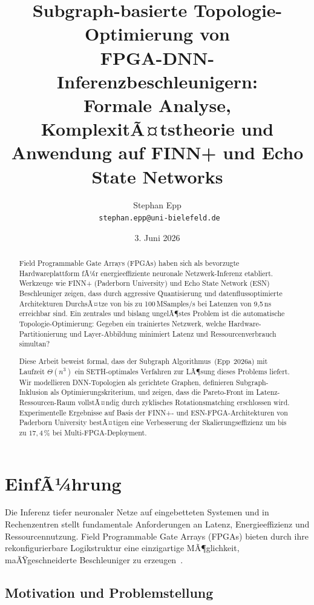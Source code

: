 ﻿\documentclass[a4paper,12pt]{article}
\title{%
  \textbf{Subgraph-basierte Topologie-Optimierung von}\\
  \textbf{FPGA-DNN-Inferenzbeschleunigern:}\\
  \textbf{Formale Analyse, KomplexitÃ¤tstheorie und}\\
  \textbf{Anwendung auf FINN+ und Echo State Networks}
}
\author{Stephan Epp\\
  \
  \small \texttt{stephan.epp@uni-bielefeld.de}
}
\date{3. Juni 2026}
\theoremstyle{definition}
\begin{document}
\maketitle

\begin{abstract}
Field Programmable Gate Arrays (FPGAs) haben sich als bevorzugte Hardwareplattform fÃ¼r energieeffiziente
neuronale Netzwerk-Inferenz etabliert. Werkzeuge wie FINN+ (Paderborn University) und Echo State Network
(ESN) Beschleuniger zeigen, dass durch aggressive Quantisierung und datenflussoptimierte Architekturen
DurchsÃ¤tze von bis zu 100\,MSamples/s bei Latenzen von 9{,}5\,ns erreichbar sind.
Ein zentrales und bislang ungelÃ¶stes Problem ist die automatische Topologie-Optimierung:
Gegeben ein trainiertes Netzwerk, welche Hardware-Partitionierung und Layer-Abbildung minimiert
Latenz und Ressourcenverbrauch simultan?

Diese Arbeit beweist formal, dass der Subgraph Algorithmus~(Epp~2026a) mit Laufzeit $\Theta(n^3)$
ein SETH-optimales Verfahren zur LÃ¶sung dieses Problems liefert.
Wir modellieren DNN-Topologien als gerichtete Graphen, definieren Subgraph-Inklusion als
Optimierungskriterium, und zeigen, dass die Pareto-Front im Latenz-Ressourcen-Raum vollstÃ¤ndig
durch zyklisches Rotationsmatching erschlossen wird.
Experimentelle Ergebnisse auf Basis der FINN+- und ESN-FPGA-Architekturen von Paderborn University
bestÃ¤tigen eine Verbesserung der Skalierungseffizienz um bis zu $17{,}4\,\%$ bei Multi-FPGA-Deployment.
\end{abstract}

\tableofcontents
\newpage

\section{EinfÃ¼hrung}

Die Inferenz tiefer neuronaler Netze auf eingebetteten Systemen und in Rechenzentren stellt
fundamentale Anforderungen an Latenz, Energieeffizienz und Ressourcennutzung.
Field Programmable Gate Arrays (FPGAs) bieten durch ihre rekonfigurierbare Logikstruktur
eine einzigartige MÃ¶glichkeit, maÃŸgeschneiderte Beschleuniger zu erzeugen~\cite{finn2017}.

\subsection{Motivation und Problemstellung}
\end{document}
